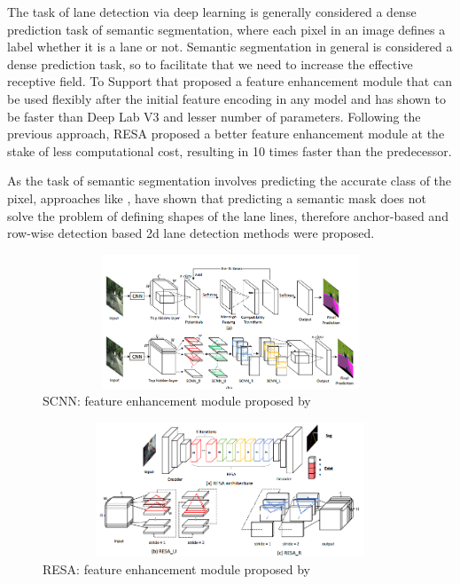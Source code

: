         The task of lane detection via deep learning is generally considered a dense prediction task of semantic segmentation, where each pixel in an image defines a label whether it is a lane or not. Semantic segmentation in general is considered a dense prediction task, so to facilitate that we need to increase the effective receptive field. To Support that \cite{DBLP:journals/corr/abs-1712-06080} proposed a feature enhancement module that can be used flexibly after the initial feature encoding in any model and has shown to be faster than Deep Lab V3 \cite{DBLP:journals/corr/ChenPSA17} and lesser number of parameters. Following the previous approach, RESA \cite{DBLP:journals/corr/abs-2008-13719} proposed a better feature enhancement module at the stake of less computational cost, resulting in 10 times faster than the predecessor. 
        
        As the task of semantic segmentation involves predicting the accurate class of the pixel, approaches like \cite{https://doi.org/10.48550/arxiv.2010.12035}, \cite{inbook} have shown that predicting a semantic mask does not solve the problem of defining shapes of the lane lines, therefore anchor-based and row-wise detection based 2d lane detection methods were proposed.
        
         \begin{figure}[h]
    \centering
\includegraphics[width=12cm, height=4cm]{images/scnn_module.png}
    \caption{SCNN: feature enhancement module proposed by  \cite{DBLP:journals/corr/abs-1712-06080}}
    \end{figure}
    
     \begin{figure}[h]
    \centering
\includegraphics[width=12cm, height=4cm]{images/resa_module.png}
    \caption{RESA: feature enhancement module proposed by \cite{DBLP:journals/corr/abs-2008-13719}}
    \end{figure}

